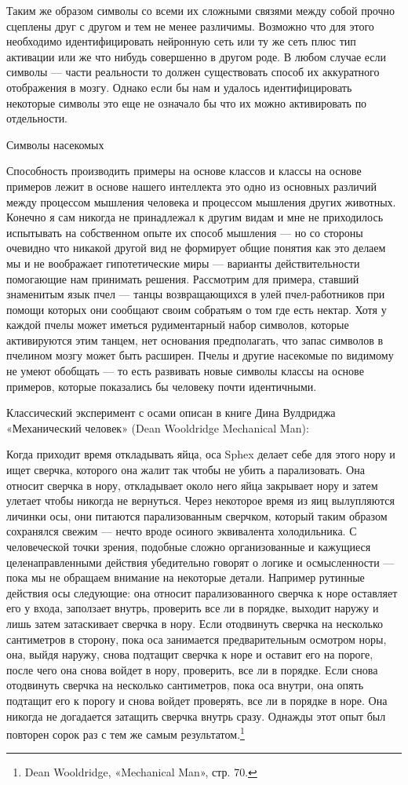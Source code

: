 \documentclass[../main.tex]{subfiles}
\begin{document}
Таким же образом символы со всеми их сложными связями между собой прочно сцеплены друг с другом и тем не менее различимы. Возможно что для этого необходимо идентифицировать нейронную сеть или ту же сеть плюс тип активации или же что нибудь совершенно в другом роде. В любом случае если символы --- части реальности то должен существовать способ их аккуратного отображения в мозгу. Однако если бы нам и удалось идентифицировать некоторые символы это еще не означало бы что их можно активировать по отдельности.

Символы насекомых

Способность производить примеры на основе классов и классы на основе примеров лежит в основе нашего интеллекта это одно из основных различий между процессом мышления человека и процессом мышления других животных. Конечно я сам никогда не принадлежал к другим видам и мне не приходилось испытывать на собственном опыте их способ мышления --- но со стороны очевидно что никакой другой вид не формирует общие понятия как это делаем мы и не воображает гипотетические миры --- варианты действительности помогающие нам принимать решения. Рассмотрим для примера, ставший знаменитым язык пчел --- танцы возвращающихся в улей пчел-работников при помощи которых они сообщают своим собратьям о том где есть нектар. Хотя у каждой пчелы может иметься рудиментарный набор символов, которые активируются этим танцем, нет основания предполагать, что запас символов в пчелином мозгу может быть расширен. Пчелы и другие насекомые по видимому не умеют обобщать --- то есть развивать новые символы классы на основе примеров, которые показались бы человеку почти идентичными.

Классический эксперимент с осами описан в книге Дина Вулдриджа «Механический человек» (Dean Wooldridge Mechanical Man):

Когда приходит время откладывать яйца, оса Sphex делает себе для этого нору и ищет сверчка, которого она жалит так чтобы не убить а парализовать. Она относит сверчка в нору, откладывает около него яйца закрывает нору и затем улетает чтобы никогда не вернуться. Через некоторое время из яиц вылупляются личинки осы, они питаются парализованным сверчком, который таким образом сохранялся свежим --- нечто вроде осиного эквивалента холодильника. С человеческой точки зрения, подобные сложно организованные и кажущиеся целенаправленными действия убедительно говорят о логике и осмысленности --- пока мы не обращаем внимание на некоторые детали. Например рутинные действия осы следующие: она относит парализованного сверчка к норе оставляет его у входа, заползает внутрь, проверить все ли в порядке, выходит наружу и лишь затем затаскивает сверчка в нору. Если отодвинуть сверчка на несколько сантиметров в сторону, пока оса занимается предварительным осмотром норы, она, выйдя наружу, снова подтащит сверчка к норе и оставит его на пороге, после чего она снова войдет в нору, проверить, все ли в порядке. Если снова отодвинуть сверчка на несколько сантиметров, пока оса внутри, она опять подтащит его к порогу и снова войдет проверять, все ли в порядке в норе. Она никогда не догадается затащить сверчка внутрь сразу. Однажды этот опыт был повторен сорок раз с тем же самым результатом.\footnote{Dean Wooldridge, «Mechanical Man», стр. 70.}
\end{document}
